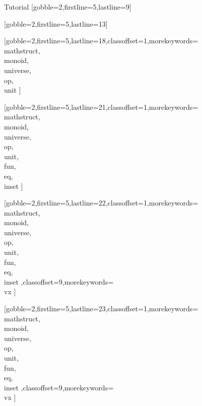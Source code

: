 \documentclass[lang={en,de}]{stex}
\begin{document}
  \begin{sfragment}{Tutorial}
    [gobble=2,firstline=5,lastline=9]

    [gobble=2,firstline=5,lastline=13]

    [gobble=2,firstline=5,lastline=18,classoffset=1,morekeywords={
    \\mathstruct,\\monoid,\\universe,\\op,\\unit
    }]

    [gobble=2,firstline=5,lastline=21,classoffset=1,morekeywords={
    \\mathstruct,\\monoid,\\universe,\\op,\\unit,\\fun,\\eq,\\inset
    }]

    [gobble=2,firstline=5,lastline=22,classoffset=1,morekeywords={
    \\mathstruct,\\monoid,\\universe,\\op,\\unit,\\fun,\\eq,\\inset
    },classoffset=9,morekeywords={
      \\vx
    }]

    [gobble=2,firstline=5,lastline=23,classoffset=1,morekeywords={
    \\mathstruct,\\monoid,\\universe,\\op,\\unit,\\fun,\\eq,\\inset
    },classoffset=9,morekeywords={
      \\vx
    }]


\end{sfragment}
\end{document}
